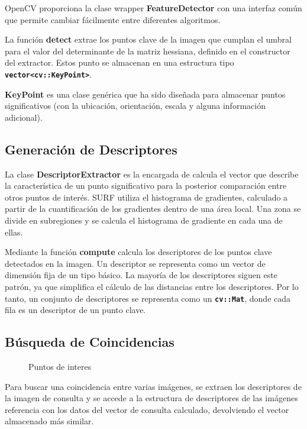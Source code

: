 OpenCV proporciona la clase wrapper \textbf{FeatureDetector} con una interfaz común que permite
cambiar fácilmente entre diferentes algoritmos.


La función \textbf{detect} extrae los puntos clave de la imagen que
cumplan el umbral para el valor del determinante de la matriz
hessiana, definido en el constructor del extractor. Estos punto se
almacenan en una estructura tipo \textbf{\texttt{vector<cv::KeyPoint>}}.

\textbf{KeyPoint} es una clase genérica que ha sido diseñada para
almacenar puntos significativos (con la ubicación, orientación, escala
y alguna información adicional).

\subsection{Generación de Descriptores}
La clase \textbf{DescriptorExtractor} es la encargada de calcula
el vector que describe la característica de un punto significativo
para la posterior comparación entre otros puntos de interés. SURF
utiliza el histograma de gradientes, calculado a partir de la
cuantificación de los gradientes dentro de una área local. Una zona se divide
en subregiones y se calcula el histograma de gradiente en cada una de
ellas.

Mediante la función \textbf{compute} calcula los descriptores de los
puntos clave detectados en la imagen. Un descriptor se representa como
un vector de dimensión fija de un tipo básico. La mayoría de los
descriptores siguen este patrón, ya que simplifica el cálculo de las
distancias entre los descriptores. Por lo tanto, un conjunto de
descriptores se representa como un \textbf{\texttt{cv::Mat}}, donde cada fila
es un descriptor de un punto clave.

\subsection{Búsqueda de Coincidencias}
\begin{figure}
\centering
{}
\caption{Puntos de interes} \label{fig:keypoints}
\end{figure}



Para buscar una coincidencia entre varias imágenes, se extraen los
descriptores de la imagen de consulta y se accede a la estructura de
descriptores de las imágenes referencia con los
datos del vector de consulta calculado, devolviendo el vector almacenado más
similar.

